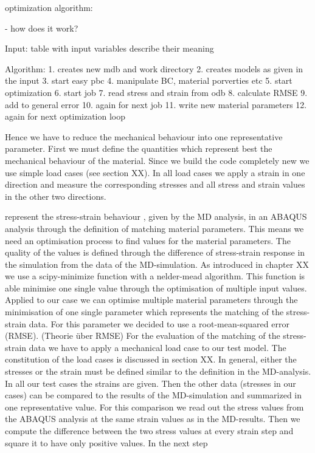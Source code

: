 


    

    optimization algorithm:

    - how does it work? 

    Input: table with input variables 
    describe their meaning

    Algorithm: 
    1. creates new mdb and work directory
    2. creates models as given in the input
    3. start easy pbc
    4. manipulate BC, material porverties etc
    5. start optimization
        6. start job
        7. read stress and strain from odb
        8. calculate RMSE 
        9. add to general error
        10. again for next job
        11. write new material parameters
        12. again for next optimization loop


Hence we have to reduce the mechanical behaviour into one representative parameter. First we must define the quantities which represent best the mechanical behaviour of the material. Since we build the code completely new we use simple load cases (see section XX). In all load cases we apply a strain in one direction and measure the corresponding stresses and all stress and strain values in the other two directions. 
    

    represent the stress-strain behaviour , given by the MD analysis, in an ABAQUS analysis through the definition of matching material parameters. This means we need an optimisation process to find values for the material parameters. The quality of the values is defined through the difference of stress-strain response in the simulation from the data of the MD-simulation. 
    As introduced in chapter XX we use a scipy-minimize function with a nelder-mead algorithm. This function is able minimise one single value through the optimisation of multiple input values. Applied to our case we can optimise multiple material parameters through the minimisation of one single parameter which represents the matching of the stress-strain data. For this parameter we decided to use a root-mean-squared error (RMSE). (Theorie über RMSE)
    For the evaluation of the matching of the stress-strain data we have to apply a mechanical load case to our test model. The constitution of the load cases is discussed in section XX. In general, either the stresses or the strain must be defined similar to the definition in the MD-analysis. In all our test cases the strains are given. Then the other data (stresses in our cases) can be compared to the results of the MD-simulation and summarized in one representative value. For this comparison we read out the stress values from the ABAQUS analysis at the same strain values as in the MD-results. Then we compute the difference between the two stress values at every strain step and square it to have only positive values. In the next step   


